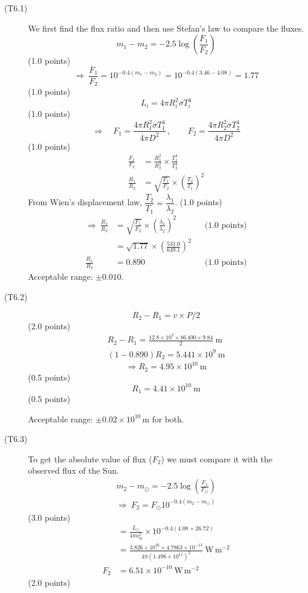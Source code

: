 \begin{description}
\item[(T6.1)]
We first find the flux ratio and then use Stefan's law to compare the fluxes.
\[ m_1 - m_2 = -2.5\log\left(\frac{F_1}{F_2}\right) \]
\hfill(1.0 points)
\[ \Rightarrow\ \frac{F_1}{F_2} = 10^{-0.4(m_1 - m_2)}
   = 10^{-0.4(3.46 - 4.08)} = 1.77 \]
\hfill(1.0 points)
\[ L_i = 4\pi R_i^2\sigma T_i^4 \]
\hfill(1.0 points)
\[ \Rightarrow\quad
   F_1 = \frac{4\pi R_1^2\sigma T_1^4}{4\pi D^2}\,,\qquad
   F_2 = \frac{4\pi R_2^2\sigma T_2^4}{4\pi D^2} \]
\hfill(1.0 points)
\begin{align*}
\frac{F_1}{F_2} &= \frac{R_1^2}{R_2^2}\times\frac{T_1^4}{T_2^4} \\
\frac{R_1}{R_2} &= \sqrt{\frac{F_1}{F_2}}\times
  \left(\frac{T_2}{T_1}\right)^2
\end{align*}
From Wien's displacement law, $\dfrac{T_2}{T_1} = \dfrac{\lambda_1}{\lambda_2}$.
\hfill(1.0 points)
\begin{align*}
\Rightarrow\ \frac{R_1}{R_2}
  &= \sqrt{\frac{F_1}{F_2}}\times\left(\frac{\lambda_1}{\lambda_2}\right)^2
  && \text{(1.0 points)} \\
  &= \sqrt{1.77}\times\left(\frac{531.0}{649.1}\right)^2 \\
\frac{R_1}{R_2} &= 0.890
  && \text{(1.0 points)}
\end{align*}
Acceptable range: $\pm 0.010$.

\item[(T6.2)]
\[ R_2 - R_1 = v \times P/2 \]
\hfill(2.0 points)
\begin{gather*}
R_2 - R_1 = \frac{12.8\times 10^3\times 86\,400\times 9.84}{2}\ \mathrm{m} \\
(1 - 0.890)R_2 = 5.441\times 10^9\ \mathrm{m}
\end{gather*}
\[ \Rightarrow R_2 = 4.95\times 10^{10}\ \mathrm{m} \]
\hfill(0.5 points)
\[ R_1 = 4.41\times 10^{10}\ \mathrm{m} \]
\hfill(0.5 points)

Acceptable range: $\pm 0.02\times 10^{10}$\,m for both.

\item[(T6.3)]
To get the absolute value of flux ($F_2$) we must compare it with the observed
flux of the Sun.
\begin{gather*}
m_2 - m_\odot = -2.5\log\left(\frac{F_2}{F_\odot}\right) \\
\Rightarrow\ F_2 = F_\odot 10^{-0.4(m_2 - m_\odot)}
\end{gather*}
\hfill(3.0 points)
\begin{align*}
&= \frac{L_\odot}{4\pi a_\oplus^2}\times 10^{-0.4(4.08 + 26.72)} \\
&= \frac{3.826\times 10^{26}\times 4.7863\times 10^{-13}}
        {4\pi(1.496\times 10^{11})^2}\ \mathrm{W\,m^{-2}} \\
F_2 &= 6.51\times 10^{-10}\ \mathrm{W\,m^{-2}}
\end{align*}
\hfill(2.0 points)


\end{description}
